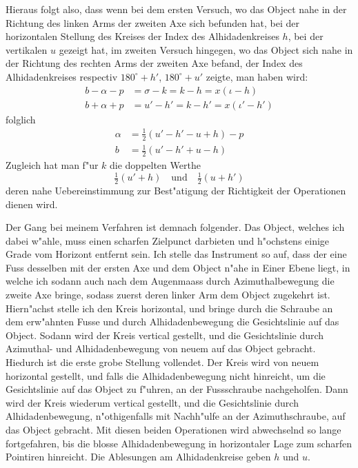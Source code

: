 \documentclass[12pt,a4paper]{article}
\begin{document}
Hieraus folgt also, dass wenn bei dem ersten Versuch, wo das Object nahe in der Richtung des
linken Arms der zweiten Axe sich befunden hat, bei der horizontalen Stellung des Kreises der Index
des Alhidadenkreises $h$, bei der vertikalen $u$ gezeigt hat, im zweiten Versuch hingegen, wo das Object
sich nahe in der Richtung des rechten Arms der zweiten Axe befand, der Index des Alhidadenkreises
respectiv $180^{\circ} + h'$, $180^{\circ} + u'$ zeigte, man haben wird:
\begin{align*}
b - \alpha - p &= \sigma - k = k - h = x(\iota - h) \\
b + \alpha + p &= u' - h' = k - h' = x(\iota' - h')
\end{align*}
folglich
\begin{align*}
\alpha &= \tfrac{1}{2}(u' - h' - u + h) - p \\
b &= \tfrac{1}{2}(u' - h' + u - h)
\end{align*}
Zugleich hat man f"ur $k$ die doppelten Werthe
\[\tfrac{1}{2}(u' + h) \quad \text{und} \quad \tfrac{1}{2}(u + h')\]
deren nahe Uebereinstimmung zur Best"atigung der Richtigkeit der Operationen dienen wird.

Der Gang bei meinem Verfahren ist demnach folgender. Das Object, welches ich dabei w"ahle,
muss einen scharfen Zielpunct darbieten und h"ochstens einige Grade vom Horizont entfernt sein. Ich
stelle das Instrument so auf, dass der eine Fuss desselben mit der ersten Axe und dem Object n"ahe in
Einer Ebene liegt, in welche ich sodann auch nach dem Augenmaass durch Azimuthalbewegung die zweite
Axe bringe, sodass zuerst deren linker Arm dem Object zugekehrt ist. Hiern"achst stelle ich den Kreis
horizontal, und bringe durch die Schraube an dem erw"ahnten Fusse und durch Alhidadenbewegung die
Gesichtslinie auf das Object. Sodann wird der Kreis vertical gestellt, und die Gesichtslinie durch
Azimuthal- und Alhidadenbewegung von neuem auf das Object gebracht. Hiedurch ist die erste grobe
Stellung vollendet. Der Kreis wird von neuem horizontal gestellt, und falls die Alhidadenbewegung nicht
hinreicht, um die Gesichtslinie auf das Object zu f"uhren, an der Fussschraube nachgeholfen. Dann wird
der Kreis wiederum vertical gestellt, und die Gesichtslinie durch Alhidadenbewegung, n"othigenfalls mit
Nachh"ulfe an der Azimuthschraube, auf das Object gebracht. Mit diesen beiden Operationen wird
abwechselnd so lange fortgefahren, bis die blosse Alhidadenbewegung in horizontaler Lage zum scharfen
Pointiren hinreicht. Die Ablesungen am Alhidadenkreise geben $h$ und $u$.
\end{document}
